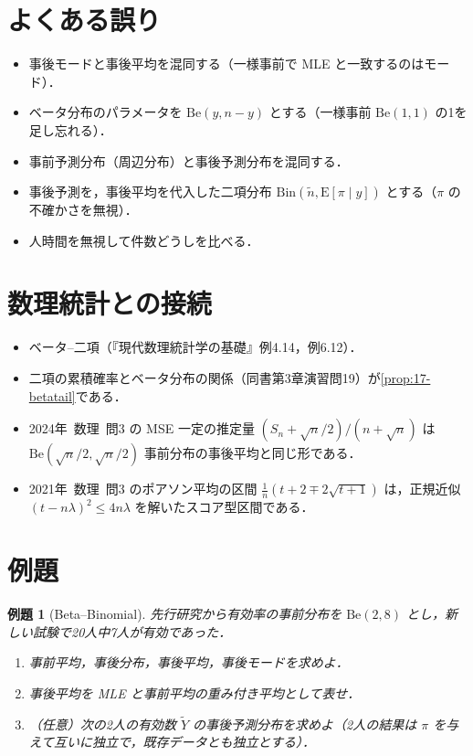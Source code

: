 \documentclass[a4paper,11pt,openany]{ltjsbook}
\newtheorem{reidai}{例題}[chapter]
\newcommand{\kakomonSM}[2]{\mbox{#1年 数理 問#2}}
\newcommand{\E}{\mathrm{E}}
\newcommand{\Bin}{\mathrm{Bin}}
\newcommand{\Be}{\mathrm{Be}}
\begin{document}
\section{よくある誤り}\label{sec:17-err}
\begin{warnbox}
\begin{itemize}
\item 事後モードと事後平均を混同する（一様事前で MLE と一致するのはモード）．
\item ベータ分布のパラメータを $\Be(y,n-y)$ とする（一様事前 $\Be(1,1)$ の1を足し忘れる）．
\item 事前予測分布（周辺分布）と事後予測分布を混同する．
\item 事後予測を，事後平均を代入した二項分布 $\Bin(\tilde n,\E[\pi\mid y])$ とする（$\pi$ の不確かさを無視）．
\item 人時間を無視して件数どうしを比べる．
\end{itemize}
\end{warnbox}

\section{数理統計との接続}\label{sec:17-link}
\begin{linkbox}
\begin{itemize}
\item ベータ--二項（『現代数理統計学の基礎』例4.14，例6.12）．
\item 二項の累積確率とベータ分布の関係（同書第3章演習問19）が\cref{prop:17-betatail}である．
\item \kakomonSM{2024}{3} の MSE 一定の推定量 $(S_n+\sqrt n/2)/(n+\sqrt n)$ は $\Be(\sqrt n/2,\sqrt n/2)$ 事前分布の事後平均と同じ形である．
\item \kakomonSM{2021}{3} のポアソン平均の区間 $\frac1n(t+2\mp2\sqrt{t+1})$ は，正規近似 $(t-n\lambda)^2\le4n\lambda$ を解いたスコア型区間である．
\end{itemize}
\end{linkbox}

\section{例題}\label{sec:17-ex}
\begin{reidai}[Beta--Binomial]\label{reidai:17-1}
先行研究から有効率の事前分布を $\Be(2,8)$ とし，新しい試験で20人中7人が有効であった．
\begin{enumerate}[label=(\arabic*)]
\item 事前平均，事後分布，事後平均，事後モードを求めよ．
\item 事後平均を MLE と事前平均の重み付き平均として表せ．
\item （任意）次の2人の有効数 $\tilde Y$ の事後予測分布を求めよ（2人の結果は $\pi$ を与えて互いに独立で，既存データとも独立とする）．
\end{enumerate}
\end{reidai}
\end{document}
